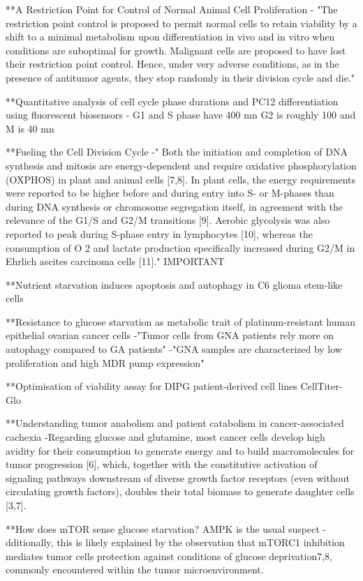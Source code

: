\documentclass[11pt,a4paper]{article}
\begin{document}
**A Restriction Point for Control of Normal Animal Cell Proliferation
- "The restriction point control is proposed to permit normal cells to retain viability by a shift to a minimal metabolism upon differentiation in vivo and in vitro when conditions are suboptimal for growth. Malignant cells are proposed to have lost their restriction point control. Hence, under very adverse conditions, as in the presence of antitumor agents, they stop randomly in their division cycle and die."

**Quantitative analysis of cell cycle phase durations and PC12 differentiation using fluorescent biosensors
- G1 and S phase have 400 mn G2 is roughly 100 and M is 40 mn

**Fueling the Cell Division Cycle
-" Both the initiation and completion of DNA synthesis and mitosis
are energy-dependent and require oxidative phosphorylation (OXPHOS) in plant and animal cells [7,8]. In plant cells, the energy requirements were reported to be higher before and during entry into S- or M-phases than during DNA synthesis or chromosome segregation itself, in agreement with the relevance of the G1/S and G2/M transitions [9]. Aerobic glycolysis was also reported to peak during S-phase entry in lymphocytes [10], whereas the consumption of O 2 and lactate production specifically increased during G2/M in Ehrlich ascites carcinoma cells [11]." IMPORTANT

**Nutrient starvation induces apoptosis and autophagy in C6 glioma stem-like cells 


**Resistance to glucose starvation as metabolic trait of platinum-resistant human epithelial ovarian cancer cells
-"Tumor cells from GNA patients rely more on autophagy compared to GA patients"
-"GNA samples are characterized by low proliferation and high MDR pump expression"

**Optimisation of viability assay for DIPG patient-derived cell lines
 CellTiter-Glo
 
 **Understanding tumor anabolism and patient catabolism in cancer-associated cachexia
-Regarding glucose and glutamine, most cancer cells develop high avidity for their consumption to generate energy and to build macromolecules for tumor progression [6], which, together with the constitutive activation of signaling pathways downstream of diverse growth factor receptors (even without circulating growth factors), doubles their total biomass to generate daughter cells [3,7].

**How does mTOR sense glucose starvation? AMPK is the usual suspect
- dditionally, this is likely explained by the observation that mTORC1 inhibition mediates tumor cells protection against conditions of glucose deprivation7,8, commonly encountered within the tumor microenvironment.
\end{document}
